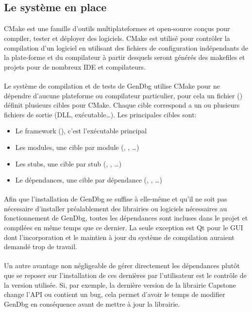 \documentclass[11pt, book, english, french, standardlists]{upmethodology-document}
\begin{document}
			\subsection{Le système en place}
				\paragraph*{}
					CMake est une famille d'outils multiplateformes et open-source conçus pour compiler, tester et déployer des logiciels. CMake est utilisé pour contrôler la compilation d'un logiciel en utilisant des fichiers de configuration indépendants de la plate-forme et du compilateur à partir desquels seront générés des makefiles et projets pour de nombreux IDE et compilateurs.
				\paragraph*{}
					Le système de compilation et de tests de GenDbg utilise CMake pour ne dépendre d'aucune plateforme ou compilateur particulier, pour cela un fichier () définit plusieurs cibles pour CMake. Chaque cible correspond a un ou plusieurs fichiers de sortie (\acrshort{DLL}, exécutable\ldots). Les principales cibles sont:
					\begin{itemize}
						\item Le framework (), c'est l'exécutable principal
						\item Les modules, une cible par module (, , \ldots)
						\item Les stubs, une cible par stub (, , \ldots)
						\item Le dépendances, une cible par dépendance (, , \ldots)
					\end{itemize}
				\paragraph*{}
					Afin que l'installation de GenDbg se suffise à elle-même et qu'il ne soit pas nécessaire d'installer préalablement des librairies ou logiciels nécessaires au fonctionnement de GenDbg, toutes les dépendances sont incluses dans le projet et compilées en même temps que ce dernier. La seule exception est Qt pour le \gls{GUI} dont l'incorporation et le maintien à jour du système de compilation auraient demandé trop de travail.
				\paragraph*{}
					Un autre avantage non négligeable de gérer directement les dépendances plutôt que se reposer sur l'installation de ces dernières par l'utilisateur est le contrôle de la version utilisée. Si, par exemple, la dernière version de la librairie Capstone change l'\gls{API} ou contient un bug, cela permet d'avoir le temps de modifier GenDbg en conséquence avant de mettre à jour la librairie.
\end{document}
